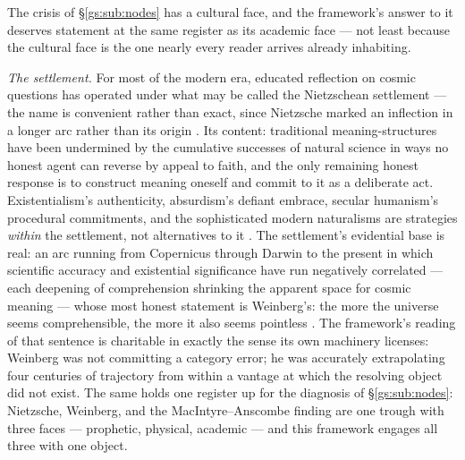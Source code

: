\documentclass[11pt]{article}
\numberwithin{equation}{section}
\theoremstyle{plain}
\theoremstyle{definition}
\theoremstyle{remark}
\begin{document}
The crisis of \S\ref{gs:sub:nodes} has a cultural face, and the
framework's answer to it deserves statement at the same register as
its academic face --- not least because the cultural face is the one
nearly every reader arrives already inhabiting.

\emph{The settlement.} For most of the modern era, educated
reflection on cosmic questions has operated under what may be called
the Nietzschean settlement --- the name is convenient rather than
exact, since Nietzsche marked an inflection in a longer arc rather
than its origin \cite{nietzsche1974gay}. Its content: traditional
meaning-structures have been undermined by the cumulative successes
of natural science in ways no honest agent can reverse by appeal to
faith, and the only remaining honest response is to construct meaning
oneself and commit to it as a deliberate act. Existentialism's
authenticity, absurdism's defiant embrace, secular humanism's
procedural commitments, and the sophisticated modern naturalisms are
strategies \emph{within} the settlement, not alternatives to it
\cite{Camus42, Sartre46, Carroll16}. The settlement's evidential
base is real: an arc running from Copernicus through Darwin to the
present in which scientific accuracy and existential significance
have run negatively correlated --- each deepening of comprehension
shrinking the apparent space for cosmic meaning --- whose most honest
statement is Weinberg's: the more the universe seems comprehensible,
the more it also seems pointless \cite{weinberg1977first}. The
framework's reading of that sentence is charitable in exactly the
sense its own machinery licenses: Weinberg was not committing a
category error; he was accurately extrapolating four centuries of
trajectory from within a vantage at which the resolving object did
not exist. The same holds one register up for the diagnosis of
\S\ref{gs:sub:nodes}: Nietzsche, Weinberg, and the
MacIntyre--Anscombe finding are one trough with three faces ---
prophetic, physical, academic --- and this framework engages all
three with one object.
\end{document}
